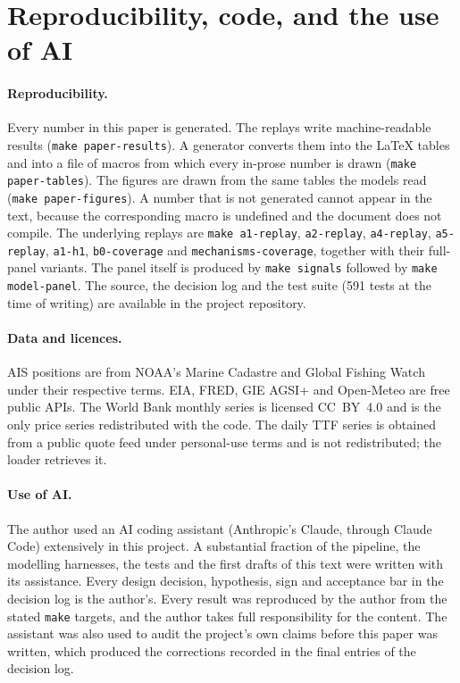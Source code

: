 \section{Reproducibility, code, and the use of AI}\label{app:repro}

\paragraph{Reproducibility.} Every number in this paper is generated. The replays
write machine-readable results (\texttt{make paper-results}). A generator converts
them into the LaTeX tables and into a file of macros from which every in-prose
number is drawn (\texttt{make paper-tables}). The figures are drawn from the same
tables the models read (\texttt{make paper-figures}). A number that is not generated
cannot appear in the text, because the corresponding macro is undefined and the
document does not compile. The underlying replays are \texttt{make a1-replay},
\texttt{a2-replay}, \texttt{a4-replay}, \texttt{a5-replay}, \texttt{a1-h1},
\texttt{b0-coverage} and \texttt{mechanisms-coverage}, together with their
full-panel variants. The panel itself is produced by \texttt{make signals} followed
by \texttt{make model-panel}. The source, the decision log and the test suite (591
tests at the time of writing) are available in the project repository.

\paragraph{Data and licences.} AIS positions are from NOAA's Marine Cadastre and
Global Fishing Watch under their respective terms. EIA, FRED, GIE AGSI+ and
Open-Meteo are free public APIs. The World Bank monthly series is licensed CC~BY~4.0
and is the only price series redistributed with the code. The daily TTF series is
obtained from a public quote feed under personal-use terms and is not redistributed;
the loader retrieves it.

\paragraph{Use of AI.} The author used an AI coding assistant (Anthropic's Claude,
through Claude Code) extensively in this project. A substantial fraction of the
pipeline, the modelling harnesses, the tests and the first drafts of this text were
written with its assistance. Every design decision, hypothesis, sign and acceptance
bar in the decision log is the author's. Every result was reproduced by the author
from the stated \texttt{make} targets, and the author takes full responsibility for
the content. The assistant was also used to audit the project's own claims before
this paper was written, which produced the corrections recorded in the final entries
of the decision log. %
